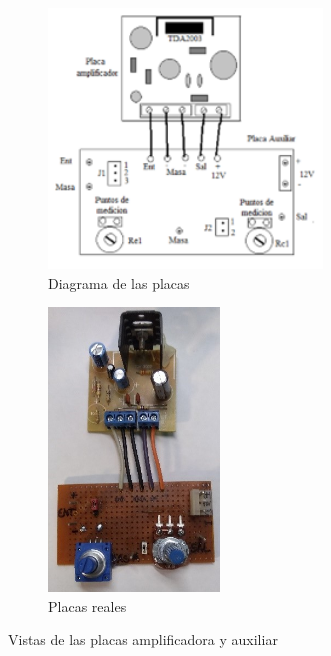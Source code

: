 \begin{figure}[H]
    \begin{center}
        \begin{subfigure}[b]{0.5\textwidth}
        \centering  
            \includegraphics[width=0.8\textwidth]{Imagenes/placa1.png}
        \caption{Diagrama de las placas}
        \label{fig:placa1}
    \end{subfigure}
    \hfill
    \begin{subfigure}[b]{0.49\textwidth}
        \centering
            \includegraphics[width=0.5\textwidth]{Imagenes/placa1b.jpg}
        \caption{Placas reales}
        \label{fig:placa1b}
    \end{subfigure}
    \caption{Vistas de las placas amplificadora y auxiliar}
    \label{fig:DUT}
    \end{center}
\end{figure}


